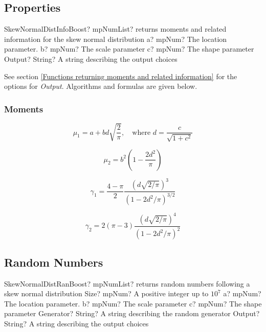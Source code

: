\subsection{Properties}
\label{SkewNormalDistributionProperties}


\begin{mpFunctionsExtract}
	\mpFunctionFourNotImplemented
	{SkewNormalDistInfoBoost? mpNumList? returns moments and related information for the skew normal distribution}
	{a? mpNum? The location parameter.}
	{b? mpNum? The scale parameter}
	{c? mpNum? The shape parameter}
	{Output? String? A string describing the output choices}
\end{mpFunctionsExtract}

\vspace{0.3cm}

See section \ref{Functions returning moments and related information} for the options for {\itshape\sffamily Output}. Algorithms and formulas are given below.

\subsubsection{Moments}

\begin{equation} 
\mu_1 = a+bd\sqrt{\frac{2}{\pi}}, \quad \text{where } d=\frac{c}{\sqrt{1+c^2}}
\end{equation}

\begin{equation} 
\mu_2 = b^2 \left(1-\frac{2d^2}{\pi} \right)
\end{equation}

\begin{equation} 
\gamma_1 = \frac{4-\pi}{2} \frac{\left(d\sqrt{2/\pi}\right)^3}{(1-2d^2/\pi)^{3/2}}
\end{equation}

\begin{equation} 
\gamma_2 = 2(\pi-3) \frac{\left(d\sqrt{2/\pi}\right)^4}{(1-2d^2/\pi)^{2}}
\end{equation}


\subsection{Random Numbers}
\label{SkewNormalDistributionRandom}

\begin{mpFunctionsExtract}
	\mpFunctionSixNotImplemented
	{SkewNormalDistRanBoost? mpNumList? returns random numbers following a skew normal distribution}
	{Size? mpNum? A positive integer up to $10^7$}
	{a? mpNum? The location parameter.}
	{b? mpNum? The scale parameter}
	{c? mpNum? The shape parameter}
	{Generator? String? A string describing the random generator}
	{Output? String? A string describing the output choices}
\end{mpFunctionsExtract}

